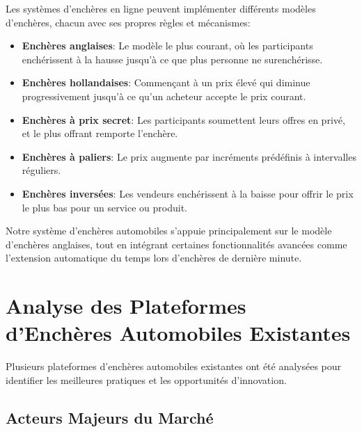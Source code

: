Les systèmes d'enchères en ligne peuvent implémenter différents modèles d'enchères, chacun avec ses propres règles et mécanismes:

\begin{itemize}
    \item \textbf{Enchères anglaises}: Le modèle le plus courant, où les participants enchérissent à la hausse jusqu'à ce que plus personne ne surenchérisse.
    
    \item \textbf{Enchères hollandaises}: Commençant à un prix élevé qui diminue progressivement jusqu'à ce qu'un acheteur accepte le prix courant.
    
    \item \textbf{Enchères à prix secret}: Les participants soumettent leurs offres en privé, et le plus offrant remporte l'enchère.
    
    \item \textbf{Enchères à paliers}: Le prix augmente par incréments prédéfinis à intervalles réguliers.
    
    \item \textbf{Enchères inversées}: Les vendeurs enchérissent à la baisse pour offrir le prix le plus bas pour un service ou produit.
\end{itemize}

Notre système d'enchères automobiles s'appuie principalement sur le modèle d'enchères anglaises, tout en intégrant certaines fonctionnalités avancées comme l'extension automatique du temps lors d'enchères de dernière minute.

\section{Analyse des Plateformes d'Enchères Automobiles Existantes}

Plusieurs plateformes d'enchères automobiles existantes ont été analysées pour identifier les meilleures pratiques et les opportunités d'innovation.

\subsection{Acteurs Majeurs du Marché}

